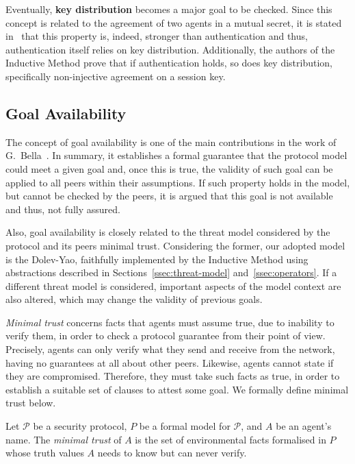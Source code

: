 Eventually, \textbf{key distribution} becomes a major goal to be checked. Since this concept is related to the agreement of two agents in a mutual secret, it is stated in~\cite{BellareRogaway93} that this property is, indeed, stronger than authentication and thus, authentication itself relies on key distribution. Additionally, the authors of the Inductive Method prove that if authentication holds, so does key distribution, specifically non-injective agreement on a session key.



\subsection{Goal Availability}
The concept of goal availability is one of the main contributions in the work of G.~Bella~\cite{Bella2007}. In summary, it establishes a formal guarantee that the protocol model could meet a given goal and, once this is true, the validity of such goal can be applied to all peers within their assumptions. If such property holds in the model, but cannot be checked by the peers, it is argued that this goal is not available and thus, not fully assured.

Also, goal availability is closely related to the threat model considered by the protocol and its peers minimal trust. Considering the former, our adopted model is the Dolev-Yao, faithfully implemented by the Inductive Method using abstractions described in Sections~\ref{ssec:threat-model} and~\ref{ssec:operators}. If a different threat model is considered, important aspects of the model context are also altered, which may change the validity of previous goals.

\textit{Minimal trust} concerns facts that agents must assume true, due to inability to verify them, in order to check a protocol guarantee from their point of view. Precisely, agents can only verify what they send and receive from the network, having no guarantees at all about other peers. Likewise, agents cannot state if they are compromised. Therefore, they must take such facts as true, in order to establish a suitable set of clauses to attest some goal. We formally define minimal trust below.

\begin{definition}
  Let \(\mathcal{P}\) be a security protocol, \(P\) be a formal model for \(\mathcal{P}\), and \(A\) be an agent's name. The \textit{minimal trust} of \(A\) is the set of environmental facts formalised in \(P\) whose truth values \(A\) needs to know but can never verify.
\end{definition}

